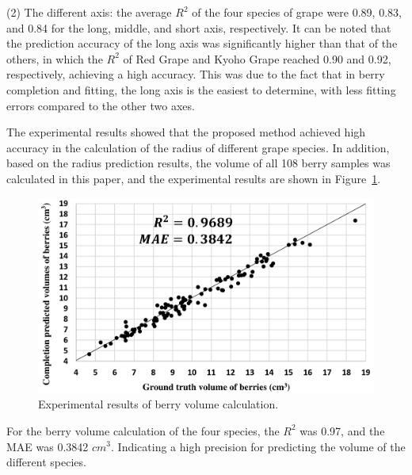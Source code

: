 \documentclass[12pt]{article}
\begin{document}
(2) The different axis: the average $R^2$ of the four species of grape were 0.89, 0.83, and 0.84 for the long, middle, and short axis, respectively. 
It can be noted that the prediction accuracy of the long axis was significantly higher than that of the others, in which the $R^2$ of Red Grape and Kyoho Grape reached 0.90 and 0.92, respectively, achieving a high accuracy. 
This was due to the fact that in berry completion and fitting, the long axis is the easiest to determine, with less fitting errors compared to the other two axes.

The experimental results showed that the proposed method achieved high accuracy in the calculation of the radius of different grape species. 
In addition, based on the radius prediction results, the volume of all 108 berry samples was calculated in this paper, and the experimental results are shown in Figure~\ref{fig:raw18}.

\begin{figure}[hbt!]
    \centering
    \includegraphics[width=1\textwidth]{figures/Figure15.pdf}
    \caption{Experimental results of berry volume calculation. }
    \label{fig:raw18}
\end{figure}

For the berry volume calculation of the four species, the $R^2$ was 0.97, and the MAE was 0.3842 $cm^3$. Indicating a high precision for predicting the volume of the different species.
\end{document}
